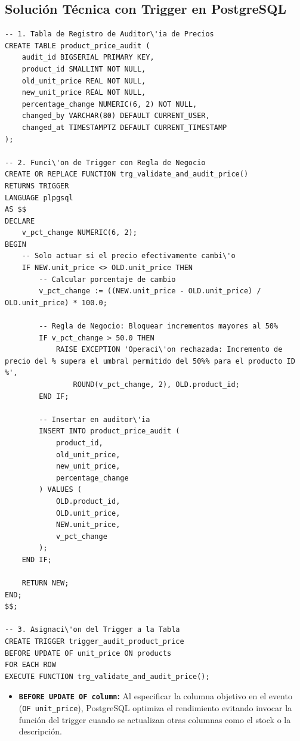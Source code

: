 \subsection{Soluci\'on T\'ecnica con Trigger en PostgreSQL}

\begin{lstlisting}[style=sqlstyle, caption={Trigger con validaci\'on de umbral y auditor\'ia}]
-- 1. Tabla de Registro de Auditor\'ia de Precios
CREATE TABLE product_price_audit (
    audit_id BIGSERIAL PRIMARY KEY,
    product_id SMALLINT NOT NULL,
    old_unit_price REAL NOT NULL,
    new_unit_price REAL NOT NULL,
    percentage_change NUMERIC(6, 2) NOT NULL,
    changed_by VARCHAR(80) DEFAULT CURRENT_USER,
    changed_at TIMESTAMPTZ DEFAULT CURRENT_TIMESTAMP
);

-- 2. Funci\'on de Trigger con Regla de Negocio
CREATE OR REPLACE FUNCTION trg_validate_and_audit_price()
RETURNS TRIGGER
LANGUAGE plpgsql
AS $$
DECLARE
    v_pct_change NUMERIC(6, 2);
BEGIN
    -- Solo actuar si el precio efectivamente cambi\'o
    IF NEW.unit_price <> OLD.unit_price THEN
        -- Calcular porcentaje de cambio
        v_pct_change := ((NEW.unit_price - OLD.unit_price) / OLD.unit_price) * 100.0;

        -- Regla de Negocio: Bloquear incrementos mayores al 50%
        IF v_pct_change > 50.0 THEN
            RAISE EXCEPTION 'Operaci\'on rechazada: Incremento de precio del % supera el umbral permitido del 50%% para el producto ID %',
                ROUND(v_pct_change, 2), OLD.product_id;
        END IF;

        -- Insertar en auditor\'ia
        INSERT INTO product_price_audit (
            product_id,
            old_unit_price,
            new_unit_price,
            percentage_change
        ) VALUES (
            OLD.product_id,
            OLD.unit_price,
            NEW.unit_price,
            v_pct_change
        );
    END IF;

    RETURN NEW;
END;
$$;

-- 3. Asignaci\'on del Trigger a la Tabla
CREATE TRIGGER trigger_audit_product_price
BEFORE UPDATE OF unit_price ON products
FOR EACH ROW
EXECUTE FUNCTION trg_validate_and_audit_price();
\end{lstlisting}

\begin{engtip}
\begin{itemize}
    \item \textbf{\texttt{BEFORE UPDATE OF column}:} Al especificar la columna objetivo en el evento (\texttt{OF unit\_price}), PostgreSQL optimiza el rendimiento evitando invocar la funci\'on del trigger cuando se actualizan otras columnas como el stock o la descripci\'on.
\end{itemize}
\end{engtip}

